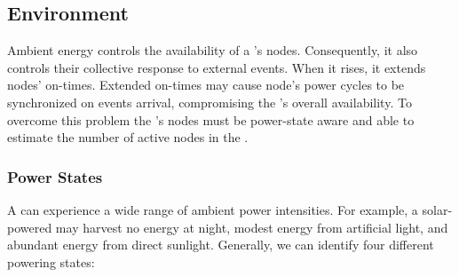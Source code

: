\subsection{Environment}
Ambient energy controls the availability of a \sys's nodes.  Consequently, it also controls their collective response to external events. When it rises, it extends nodes' on-times. Extended on-times may cause node's power cycles to be synchronized on events arrival, compromising the \sys's overall availability. To overcome this problem the \sys's nodes must be power-state aware and able to estimate the number of active nodes in the \sys.
%
\subsubsection{Power States}
\label{sec:power_state}
A \sys can experience a wide range of ambient power intensities. For example, a solar-powered \sys may harvest no energy at night, modest energy from artificial light, and abundant energy from direct sunlight.  Generally, we can identify four different \sys powering states: 
